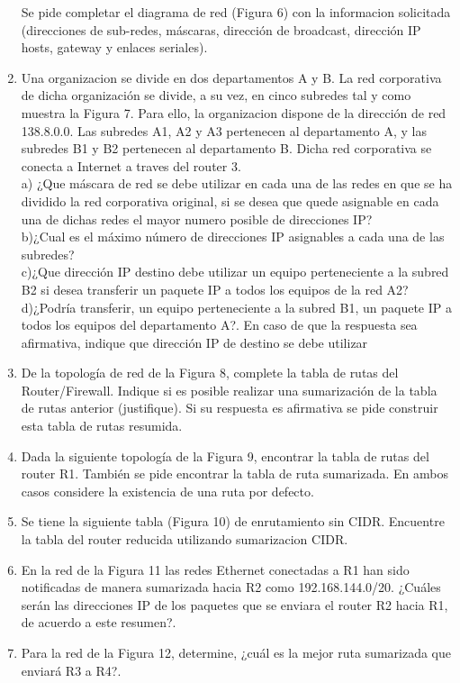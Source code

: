 \documentclass{udparticle}
\begin{document}
\begin{enumerate}
Se pide completar el diagrama de red (Figura 6) con la informacion solicitada
(direcciones de sub-redes, máscaras, dirección de broadcast, dirección IP 
hosts, gateway y enlaces seriales).
\clearpage
\item Una organizacion se divide en dos departamentos A y B. La red corporativa de 
dicha organización se divide, a su vez, en cinco subredes tal y como muestra la 
Figura 7. Para ello, la organizacion dispone de la dirección de red 138.8.0.0. 
Las subredes A1, A2 y A3 pertenecen al departamento A, y las subredes B1 y B2 
pertenecen al departamento B. Dicha red corporativa se conecta a Internet    a traves 
del router 3.\\
a) ¿Que máscara de red se debe utilizar en cada una de las redes en que se ha   
dividido la red corporativa original, si se desea que quede asignable en cada una 
de dichas redes el mayor numero posible de direcciones IP?\\

b)¿Cual es el máximo número de direcciones IP asignables a cada una de las subredes?\\

c)¿Que dirección IP destino debe utilizar un equipo perteneciente a la subred B2 si
desea transferir un paquete IP a todos los equipos de la red A2?\\

d)¿Podría transferir, un equipo perteneciente a la subred B1, un paquete IP a todos
los equipos del departamento A?. En caso de que la respuesta sea afirmativa,
indique que dirección IP de destino se debe utilizar\\


\item De la topología de red de la Figura 8, complete la tabla de rutas del 
Router/Firewall. Indique si es posible realizar una sumarización de la tabla de 
rutas anterior (justifique). Si su respuesta es afirmativa se pide construir esta tabla de rutas resumida.

\item Dada la siguiente topología de la Figura 9, encontrar la tabla de rutas del 
router R1. También se pide encontrar la tabla de ruta sumarizada. En ambos casos 
considere la existencia de una ruta por defecto.

\item Se tiene la siguiente tabla (Figura 10) de enrutamiento sin CIDR. Encuentre 
la tabla del router reducida utilizando sumarizacion CIDR.
\item En la red de la Figura 11 las redes Ethernet conectadas a R1 han sido 
notificadas de manera sumarizada hacia R2 como 192.168.144.0/20. ¿Cuáles serán 
las direcciones IP de los paquetes que se enviara el router R2 hacia R1, de acuerdo a este resumen?.
\item Para la red de la Figura 12, determine, ¿cuál es la mejor ruta sumarizada que
enviará R3 a R4?. 


\end{enumerate}
\end{document}
